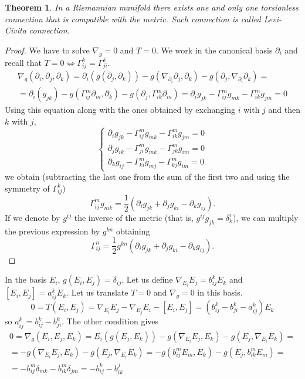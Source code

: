 \documentclass[a4paper,12pt]{book}
\newtheorem{theorem}{Theorem}
\theoremstyle{definition}
\theoremstyle{remark}
\begin{document}
\begin{theorem}
In a Riemannian manifold there exists one and only one torsionless connection that is compatible with the metric. Such connection is called \emph{Levi-Civita connection}.
\end{theorem}

\begin{proof}
We have to solve $\nabla_g=0$ and $T=0$. We work in the canonical basis $\partial_i$ and recall that $T=0\iff\Gamma_{ij}^k=\Gamma_{ji}^k$.
\begin{multline*}\nabla_g(\partial_i,\partial_j,\partial_k)=\partial_i(g(\partial_j,\partial_k))-g(\nabla_{\partial_i}\partial_j,\partial_k)-g(\partial_j,\nabla_{\partial_i}\partial_k)=\\
=\partial_i(g_{jk})-g(\Gamma_{ij}^m\partial_m,\partial_k)-g(\partial_j,\Gamma_{ik}^m\partial_m)=\partial_ig_{jk}-\Gamma_{ij}^mg_{mk}-\Gamma_{ik}^mg_{jm}=0\end{multline*}
Using this equation along with the ones obtained by exchanging $i$ with $j$ and then $k$ with $j$,
\[\begin{cases}
\partial_ig_{jk}-\Gamma_{ij}^mg_{mk}-\Gamma_{ik}^mg_{jm}=0\\
\partial_jg_{ik}-\Gamma_{ji}^mg_{mk}-\Gamma_{jk}^mg_{im}=0\\
\partial_kg_{ij}-\Gamma_{ki}^mg_{mj}-\Gamma_{kj}^mg_{im}=0
\end{cases}\]
we obtain (subtracting the last one from the sum of the first two and using the symmetry of $\Gamma_{ij}^k$)
\[\Gamma_{ij}^mg_{mk}=\frac{1}{2}(\partial_ig_{jk}+\partial_jg_{ki}-\partial_kg_{ij}).\]
If we denote by $g^{ij}$ the inverse of the metric (that is, $g^{ij}g_{jk}=\delta^i_k$), we can multiply the previous expression by $g^{kn}$ obtaining
\[\Gamma_{ij}^n=\frac{1}{2}g^{kn}(\partial_ig_{jk}+\partial_jg_{ki}-\partial_kg_{ij}).\]
\end{proof}
In the basis $E_i$, $g(E_i,E_j)=\delta_{ij}$. Let us define $\nabla_{E_i}E_j=b_{ij}^kE_k$ and $[E_i,E_j]=a_{ij}^kE_k$. Let us translate $T=0$ and $\nabla_g=0$ in this basis.
\[0=T(E_i,E_j)=\nabla_{E_i}E_j-\nabla_{E_j}E_i-[E_i,E_j]=(b_{ij}^k-b_{ji}^k-a_{ij}^k)E_k\]
so $a_{ij}^k=b_{ij}^k-b_{ji}^k$. The other condition gives
\begin{multline*}
0=\nabla_g(E_i,E_j,E_k)=E_i(g(E_j,E_k))-g(\nabla_{E_i}E_j,E_k)-g(E_j,\nabla_{E_i}E_k)=\\
=-g(\nabla_{E_i}E_j,E_k)-g(E_j,\nabla_{E_i}E_k)=-g(b_{ij}^mE_m,E_k)-g(E_j,b_{ik}^mE_m)=\\
=-b_{ij}^m\delta_{mk}-b_{ik}^m\delta_{jm}=-b_{ij}^k-b_{ik}^j\end{multline*}
\end{document}
